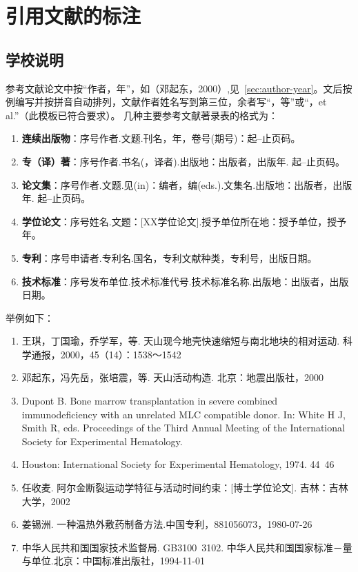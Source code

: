 
\chapter{引用文献的标注}

\section{学校说明}
参考文献论文中按“作者，年”，如（邓起东，2000）,见~\ref{sec:author-year}。文后按例编写并按拼音自动排列，文献作者姓名写到第三位，余者写“，等”或“，et al.”（此模板已符合要求）。
几种主要参考文献著录表的格式为：
\begin{enumerate}
\item \textbf{连续出版物}：序号作者.文题.刊名，年，卷号(期号)：起--止页码。
\item \textbf{专（译）著}：序号作者.书名(，译者).出版地：出版者，出版年. 起--止页码。
\item \textbf{论文集}：序号作者.文题.见(in)：编者，编(eds.).文集名.出版地：出版者，出版年. 起--止页码。
\item \textbf{学位论文}：序号姓名.文题：[XX学位论文].授予单位所在地：授予单位，授予年。
\item \textbf{专利}：序号申请者.专利名.国名，专利文献种类，专利号，出版日期。
\item \textbf{技术标准}：序号发布单位.技术标准代号.技术标准名称.出版地：出版者，出版日期。
\end{enumerate}

举例如下：
\begin{enumerate}
\item 王琪，丁国瑜，乔学军，等. 天山现今地壳快速缩短与南北地块的相对运动. 科学通报，2000，45（14）：1538～1542
\item 邓起东，冯先岳，张培震，等. 天山活动构造. 北京：地震出版社，2000 
\item Dupont B. Bone marrow transplantation in severe combined immunodeficiency with an unrelated MLC compatible donor. In: White H J, Smith R, eds. Proceedings of the Third Annual Meeting of the International Society for Experimental Hematology. \item Houston: International Society for Experimental Hematology, 1974. 44~46
\item 任收麦. 阿尔金断裂运动学特征与活动时间约束：[博士学位论文]. 吉林：吉林大学，2002
\item 姜锡洲. 一种温热外敷药制备方法.中国专利，881056073，1980-07-26
\item 中华人民共和国国家技术监督局. GB3100~3102. 中华人民共和国国家标准－量与单位.北京：中国标准出版社，1994-11-01
\end{enumerate}

